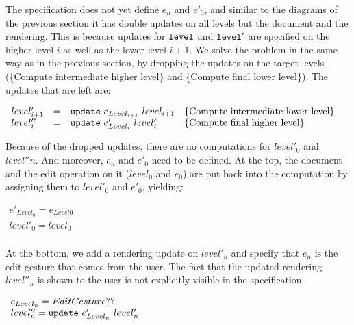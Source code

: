 
The specification does not yet define $e_n$ and $e'_0$, and similar to the diagrams of the previous section it has double updates on all levels but the document and the rendering. This is because updates for ${\tt level}$ and ${\tt level'}$ are specified on the higher level $i$ as well as the lower level $i+1$. We solve the problem in the same way as in the previous section, by dropping the updates on the target levels (\{Compute intermediate higher level\} and \{Compute final lower level\}). The updates that are left are:

\begin{small}\( \begin{array}{lcll} 
level'_{i+1} 	& = & {\tt update}~e_{Level_{i+1}}~level_{i+1}                 & \text{\{Compute intermediate lower level\}}\\
level''_{i} & = & {\tt update}~e'_{Level_{i}}~level'_{i}                 & \text{\{Compute final higher level\}}\\
\end{array}\)
\end{small}

Because of the dropped updates, there are no computations for $level'_0$ and $level''{n}$. And moreover, $e_n$ and $e'_0$ need to be defined. At the top, the document and the edit operation on it ($level_0$ and $e_0$) are put back into the computation by assigning them to $level'_0$ and $e'_0$, yielding:

\begin{small}\( \begin{array}{lcll} 
e'_{Level_{0}}  = e_{Level{0}}\\
level'_{0} =  level_{0}\\
\end{array}\)
\end{small}

At the bottom, we add a rendering update on $level'_n$ and specify that $e_n$ is the edit gesture that comes from the user. The fact that the updated rendering $level''_n$ is shown to the user is not explicitly visible in the specification.

\begin{small}\( \begin{array}{lcll} 
e_{Level_{n}}  = EditGesture ??\\
level''_{n}  =  {\tt update}~e'_{Level_{n}}~level'_{n}\\
\end{array}\)
\end{small}

